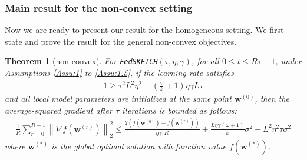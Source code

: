 \documentclass[twoside]{article}
\newtheorem{theorem}{Theorem}
\begin{document}
\subsubsection{Main result for the non-convex setting}
Now we are ready to present our result for the homogeneous setting. We first state and prove the result for the general non-convex objectives.  
\begin{theorem}[non-convex]\label{thm:lsgwd-lr} For \texttt{FedSKETCH}$(\tau, \eta, \gamma)$, for all $0\leq t\leq R\tau-1$,  under Assumptions \ref{Assu:1} to \ref{Assu:1.5}, if the learning rate satisfies \begin{align}
   1\geq {\tau^2 L^2\eta^2}+\left(\frac{\omega}{k}+1\right){\eta\gamma L}{\tau}
\label{eq:cnd-thm4.3}
\end{align}
and all local model parameters are initialized at the same point ${\boldsymbol{w}}^{(0)}$, then the average-squared gradient after $\tau$ iterations is bounded as follows:
\begin{align}
        \frac{1}{R}\sum_{r=0}^{R-1}\left\|\nabla f({\boldsymbol{w}}^{(r)})\right\|_2^2\leq \frac{2\left(f(\boldsymbol{w}^{(0)})-f(\boldsymbol{w}^{(*)})\right)}{\eta\gamma\tau R}+\frac{L\eta\gamma{\left(\omega+1\right)}}{k}\sigma^2+{L^2\eta^2\tau }\sigma^2\label{eq:thm1-result} 
\end{align}
where $\boldsymbol{w}^{(*)}$ is the global optimal solution with  function value $f(\boldsymbol{w}^{(*)})$.
\end{theorem}
\end{document}
